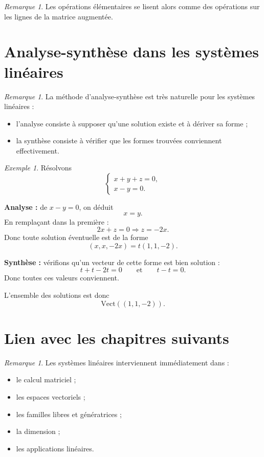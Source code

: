 \documentclass[11pt,a4paper]{article}
\theoremstyle{remark}
\newtheorem{remarque}[definition]{Remarque}
\newtheorem{exemple}[definition]{Exemple}
\newcommand{\Vect}{\mathrm{Vect}}
\begin{document}
\begin{remarque}
Les opérations élémentaires se lisent alors comme des opérations sur les lignes de la matrice augmentée.
\end{remarque}

\section{Analyse-synthèse dans les systèmes linéaires}

\begin{remarque}
La méthode d’analyse-synthèse est très naturelle pour les systèmes linéaires :
\begin{itemize}
    \item l’analyse consiste à supposer qu’une solution existe et à dériver sa forme ;
    \item la synthèse consiste à vérifier que les formes trouvées conviennent effectivement.
\end{itemize}
\end{remarque}

\begin{exemple}
Résolvons
\[
\begin{cases}
x+y+z=0,\\
x-y=0.
\end{cases}
\]

\textbf{Analyse :} de \(x-y=0\), on déduit
\[
x=y.
\]
En remplaçant dans la première :
\[
2x+z=0 \Longrightarrow z=-2x.
\]
Donc toute solution éventuelle est de la forme
\[
(x,x,-2x)=t(1,1,-2).
\]

\textbf{Synthèse :} vérifions qu’un vecteur de cette forme est bien solution :
\[
t+t-2t=0
\qquad \text{et} \qquad
t-t=0.
\]
Donc toutes ces valeurs conviennent.

L’ensemble des solutions est donc
\[
\Vect((1,1,-2)).
\]
\end{exemple}

\section{Lien avec les chapitres suivants}

\begin{remarque}
Les systèmes linéaires interviennent immédiatement dans :
\begin{itemize}
    \item le calcul matriciel ;
    \item les espaces vectoriels ;
    \item les familles libres et génératrices ;
    \item la dimension ;
    \item les applications linéaires.
\end{itemize}
\end{remarque}
\end{document}
